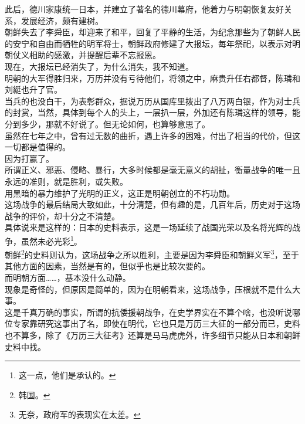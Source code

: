 \begin{multicols}{\theparacolNo}
此后，德川家康统一日本，并建立了著名的德川幕府，他着力与明朝恢复友好关系，发展经济，颇有建树。\\

朝鲜失去了李舜臣，却迎来了和平，回复了平静的生活，为纪念那些为了朝鲜人民的安宁和自由而牺牲的明军将士，朝鲜政府修建了大报坛，每年祭祀，以表示对明朝仗义相助的感激，并提醒后辈不忘报恩。\\

现在，大报坛已经消失了，为什么消失，我不知道。\\

明朝的大军得胜归来，万历并没有亏待他们，将领之中，麻贵升任右都督，陈璘和刘綎也升了官。\\

当兵的也没白干，为表彰群众，据说万历从国库里拨出了八万两白银，作为对士兵的封赏，当然，具体到每个人的头上，一层扒一层，外加还有陈璘这样的领导，能分到多少，那就不好说了。但无论如何，也算够意思了。\\

虽然在七年之中，曾有过无数的曲折，遇上许多的困难，付出了相当的代价，但这一切都是值得的。\\

因为打赢了。\\

所谓正义、邪恶、侵略、暴行，大多时候都是毫无意义的胡扯，衡量战争的唯一且永远的准则，就是胜利，或失败。\\

用黑暗的暴力维护了光明的正义，这正是明朝创立的不朽功勋。\\

这场战争的最后结局大致如此，十分清楚，但有趣的是，几百年后，历史对于这场战争的评价，却十分之不清楚。\\

具体说来是这样的：日本的史料表示，这是一场延续了战国光荣以及名将光辉的战争，虽然未必光彩\footnote{这一点，他们是承认的。}。\\

朝鲜\footnote{韩国。}的史料则认为，这场战争之所以胜利，主要是因为李舜臣和朝鲜义军\footnote{无奈，政府军的表现实在太差。}，至于其他方面的因素，当然是有的，但似乎也是比较次要的。\\

而明朝方面……，基本没什么动静。\\

现象是奇怪的，但原因是简单的，因为在明朝看来，这场战争，压根就不是什么大事。\\

这是千真万确的事实，所谓的抗倭援朝战争，在史学界实在不算个啥，也没听说哪位专家靠研究这事出了名，即使在明代，它也只是万历三大征的一部分而已，史料也不算多，除了《万历三大征考》还算是马马虎虎外，许多细节只能从日本和朝鲜史料中找。\\


\end{multicols}
